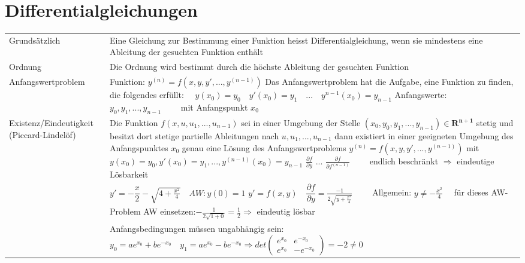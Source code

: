 \clearpage

\begin{table}[h!]
\section{Differentialgleichungen}

\begin{center}

\begin{tabularx}{540pt}{|p{100pt}|X|}
\hline
\rowcolor{Gray}
\multicolumn{2}{|c|}{\textbf{Grundlegendes}}\\
\hline
	Grundsätzlich&
	Eine Gleichung zur Bestimmung einer Funktion heisst Differentialgleichung, wenn sie mindestens eine Ableitung der gesuchten Funktion enthält \\
\hline
	Ordnung&
	Die Ordnung wird bestimmt durch die höchste Ableitung der gesuchten Funktion\\
\hline
	
	Anfangswertproblem&
	Funktion: $y^{(n)}=f(x,y,y',...,y^{(n-1)})$\newline
	Das Anfangswertproblem hat die Aufgabe, eine Funktion zu finden, die folgendes erfüllt: $\quad y(x_0)=y_0 \quad y'(x_0)=y_1\quad ...\quad y^{n-1}(x_0)=y_{n-1}$\newline
	Anfangswerte: $y_0, y_1,...,y_{n-1} \qquad$ mit Anfangspunkt $x_0$\\
\hline
	Existenz/Eindeutigkeit\newline
	(Piccard-Lindelöf)&
	Die Funktion $f(x, u, u_1, ..., u_{n-1})$ sei in einer Umgebung der Stelle \newline
	$(x_0, y_0, y_1, ..., y_{n-1}) \in \mathbf{R^{n+1}}$ stetig und besitzt dort stetige partielle Ableitungen
	nach $u, u_1, ..., u_{n-1}$ dann existiert in einer geeigneten Umgebung des Anfangspunktes $x_0$ genau eine Lösung des Anfangswertproblems\newline
	$y^{(n)} = f(x, y, y', ...,y^{(n-1)})$ mit $y(x_0) = y_0, y'(x_0) = y_1, ..., y^{(n-1)}(x_0) = y_{n-1}$ \newline
	$\frac{\partial f}{\partial y}$ ... $\frac{\partial f}{\partial f^{(n-1)}}\qquad$ endlich beschränkt $\Rightarrow$ eindeutige Lösbarkeit\\
\cline{1-2}
	&$y'=-\dfrac{x}{2}-\sqrt{4+\frac{x^2}{4}} \quad AW:y(0)=1$\newline
	$y'=f(x,y)\quad \dfrac{\partial f}{\partial y}=\frac{-1}{2\sqrt{y+\frac{x^2}{4}}} \qquad$
	Allgemein: $y\neq -\frac{x^2}{4} \quad$\newline
	für dieses AW-Problem AW einsetzen:$-\frac{1}{2\sqrt{1+0}}=\frac{1}{2}\Rightarrow$ eindeutig lösbar\\
\cline{1-2}
	&Anfangsbedingungen müssen ungabhängig sein: $y_0= ae^{x_0}+be^{-x_0}\quad y_1=ae^{x_0}-be^{-x_0} \Rightarrow det
	\begin{pmatrix}e^{x_0}& e^{-x_0}\\e^{x_0}& -e^{-x_0}\end{pmatrix}= -2\neq 0$\\
\hline
	

\end{tabularx}
\end{center}
\end{table}
